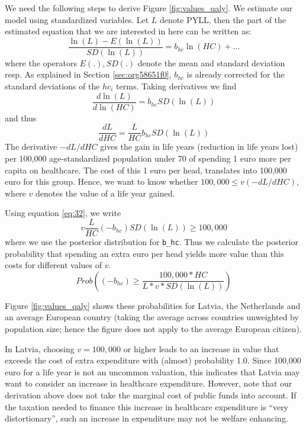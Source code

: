 \documentclass[a4paper,12pt]{article}
\begin{document}
We need the following steps to derive Figure \ref{fig:values_qaly}. We estimate our model using standardized variables. Let \(L\) denote PYLL, then the part of the estimated equation that we are interested in here can be written as:
\begin{equation}
\label{eq:27}
\frac{\ln(L)-E(\ln(L))}{SD(\ln(L))} = b_{hc} \ln(HC) + ...
\end{equation}
where the operators \(E(.),SD(.)\) denote the mean and standard deviation resp. As explained in Section \ref{sec:org58651f0}, \(b_{hc}\) is already corrected for the standard deviations of the \(hc_i\) terms. Taking derivatives we find
\begin{equation}
\label{eq:31}
\frac{d \ln(L)}{d \ln(HC)} = b_{hc} SD(\ln(L))
\end{equation}
and thus
\begin{equation}
\label{eq:32}
\frac{dL}{dHC} = \frac{L}{HC} b_{hc} SD(\ln(L))
\end{equation}
The derivative \(-dL/dHC\) gives the gain in life years (reduction in life years lost) per 100,000 age-standardized population under 70 of spending 1 euro more per capita on healthcare. The cost of this 1 euro per head, translates into 100,000 euro for this group. Hence, we want to know whether \(100,000 \leq v (-dL/dHC)\), where \(v\) denotes the value of a life year gained. 

Using equation \eqref{eq:32}, we write
\begin{equation}
\label{eq:22}
v \frac{L}{HC} (-b_{hc}) SD(\ln(L)) \geq 100,000
\end{equation}
where we use the posterior distribution for \texttt{b\_hc}. Thus we calculate the posterior probability that spending an extra euro per head yields more value than this costs for different values of \(v\).
\begin{equation}
\label{eq:41}
Prob \left((-b_{hc}) \geq \frac{100,000 * HC}{L* v *SD(\ln(L))}\right)
\end{equation}

Figure \ref{fig:values_qaly} shows these probabilities for Latvia, the Netherlands and an average European country (taking the average across countries unweighted by population size; hence the figure does not apply to the average European citizen).

In Latvia, choosing \(v = 100,000\) or higher leads to an increase in value that exceeds the cost of extra expenditure with (almost) probability 1.0. Since 100,000 euro for a life year is not an uncommon valuation, this indicates that Latvia may want to consider an increase in healthcare expenditure. However, note that our derivation above does not take the marginal cost of public funds into account. If the taxation needed to finance this increase in healthcare expenditure is ``very distortionary'', such an increase in expenditure may not be welfare enhancing.
\end{document}
